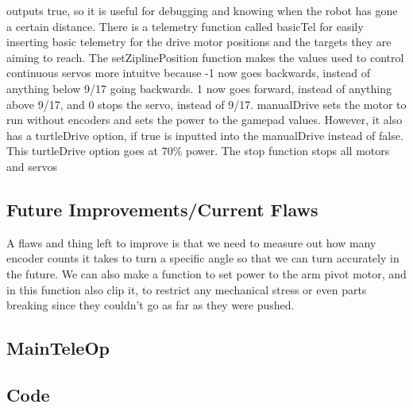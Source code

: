 \documentclass[11pt,fleqn]{article}
\begin{document}
outputs true, so it is useful for debugging and knowing when the robot has gone a certain distance.
There is a telemetry function called basicTel for easily inserting basic telemetry for the drive
motor positions and the targets they are aiming to reach. The setZiplinePosition function makes the
values used to control continuous servos more intuitve because -1 now goes backwards, instead of
anything below 9/17 going backwards. 1 now goes forward, instead of anything above 9/17, and 0 stops
the servo, instead of 9/17. manualDrive sets the motor to run without encoders and sets the power to
the gamepad values. However, it also has a turtleDrive option, if true is inputted into the
manualDrive instead of false. This turtleDrive option goes at 70\% power. The stop function stops
all motors and servos

\subsection*{Future Improvements/Current Flaws}

A flaws and thing left to improve is that we need to measure out how many encoder counts it takes to
turn a specific angle so that we can turn accurately in the future. We can also make a function to
set power to the arm pivot motor, and in this function also clip it, to restrict any mechanical
stress or even parts breaking since they couldn't go as far as they were pushed.

\begin{center}
\section*{MainTeleOp}
\end{center}

\subsection*{Code}
\end{document}
